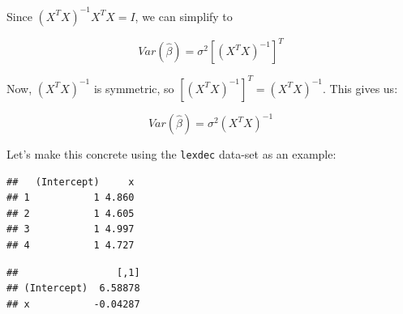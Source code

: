 \documentclass[12pt,]{krantz}
\newenvironment{Shaded}{\begin{snugshade}}{\end{snugshade}}
\newcommand{\CommentTok}[1]{\textcolor[rgb]{0.56,0.35,0.01}{\textit{#1}}}
\newcommand{\DataTypeTok}[1]{\textcolor[rgb]{0.13,0.29,0.53}{#1}}
\newcommand{\DecValTok}[1]{\textcolor[rgb]{0.00,0.00,0.81}{#1}}
\newcommand{\KeywordTok}[1]{\textcolor[rgb]{0.13,0.29,0.53}{\textbf{#1}}}
\newcommand{\NormalTok}[1]{#1}
\newcommand{\OperatorTok}[1]{\textcolor[rgb]{0.81,0.36,0.00}{\textbf{#1}}}
\begin{document}
Since \((X^TX)^{-1}X^T X = I\), we can simplify to

\begin{equation}
Var(\hat\beta)= \sigma^2 [(X^TX)^{-1}]^{T} 
\end{equation}

Now, \((X^TX)^{-1}\) is symmetric, so
\([(X^TX)^{-1}]^T=(X^TX)^{-1}\). This gives us:

\begin{equation}
Var(\hat\beta)= \sigma^2 (X^TX)^{-1} 
\end{equation}

Let's make this concrete using the \texttt{lexdec} data-set as an example:

\begin{Shaded}
\end{Shaded}

\begin{verbatim}
##   (Intercept)     x
## 1           1 4.860
## 2           1 4.605
## 3           1 4.997
## 4           1 4.727
\end{verbatim}

\begin{Shaded}
\end{Shaded}

\begin{verbatim}
##                 [,1]
## (Intercept)  6.58878
## x           -0.04287
\end{verbatim}

\begin{Shaded}
\end{Shaded}
\end{document}
